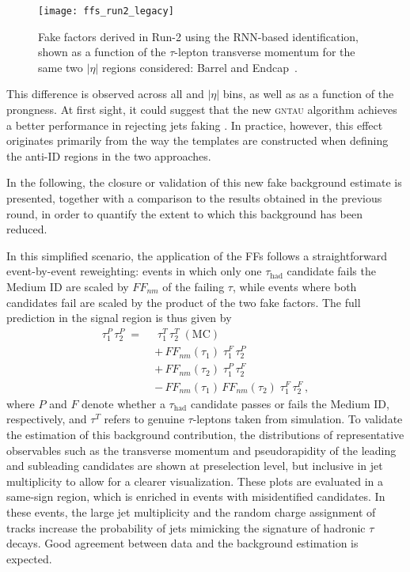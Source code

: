   \begin{figure}[htbp]
    \centering
    \texttt{[image: ffs\_run2\_legacy]}
    \caption{Fake factors derived in Run-2 using the RNN-based \tauhad identification, 
    shown as a function of the $\tau$-lepton transverse momentum for the same two $|\eta|$ regions considered: Barrel and Endcap~\cite{serhat_tesis}.}
    \label{fig:ffs_run2_rnn}
  \end{figure}
This difference is observed across all \pt and $|\eta|$ bins, as well as as a function of the prongness. At first sight, it could suggest that the new \textsc{gntau} algorithm achieves a better performance in rejecting jets faking \tauhad. In practice, however, this effect originates primarily from the way the templates are constructed when defining the anti-ID regions in the two approaches. 

In the following, the closure or validation of this new fake background estimate is presented, together with a comparison to the results obtained in the previous round, in order to quantify the extent to which this background has been reduced.

In this simplified scenario, the application of the FFs follows a straightforward event-by-event reweighting: events in which only one $\tau_{\mathrm{had}}$ candidate fails the Medium ID are scaled by $FF_{nm}$ of the failing $\tau$, while events where both candidates fail are scaled by the product of the two fake factors. The full prediction in the signal region is thus given by
\begin{align}
    \tau_1^{P}\,\tau_2^{P} \;=\;&\;
    \tau_1^{T}\,\tau_2^{T}\;(\text{MC}) \nonumber \\[0.2cm]
    &+\, FF_{nm}(\tau_1)\;\tau_1^{F}\,\tau_2^{P} \nonumber \\[0.2cm]
    &+\, FF_{nm}(\tau_2)\;\tau_1^{P}\,\tau_2^{F} \nonumber \\[0.2cm]
    &-\, FF_{nm}(\tau_1)\,FF_{nm}(\tau_2)\;\tau_1^{F}\,\tau_2^{F}\,,
    \label{eq_fakes}
    \end{align}
where $P$ and $F$ denote whether a $\tau_{\mathrm{had}}$ candidate passes or fails the Medium ID, respectively, and $\tau^T$ refers to genuine $\tau$-leptons taken from simulation.  
To validate the estimation of this background contribution, the distributions of representative observables such as the transverse momentum and pseudorapidity of the leading and subleading \tauhad candidates are shown at preselection level, but inclusive in jet multiplicity to allow for a clearer visualization.  
These plots are evaluated in a same-sign region, which is enriched in events with misidentified \tauhad candidates. In these events, the large jet multiplicity and the random charge assignment of tracks increase the probability of jets mimicking the signature of hadronic $\tau$ decays. Good agreement between data and the background estimation is expected. 
    
